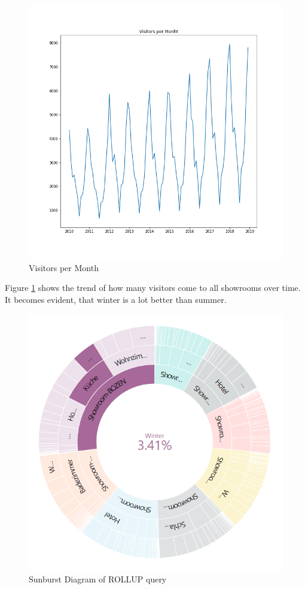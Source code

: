 \documentclass[letterpaper,12pt]{article}
\begin{document}
\begin{figure}[H] 
        \centering
        \includegraphics[width=\columnwidth]{../images/month.png}
        \caption{
                \label{fig:month}  
                Visitors per Month
        }
\end{figure}

Figure \ref{fig:month} shows the trend of how many visitors come to all showrooms over time. It becomes evident, that winter is a lot better than summer.

\begin{figure}[H] 
        \centering
        \includegraphics[width=\columnwidth]{../images/sunburst.PNG}
        \caption{
                \label{fig:sunburst}  
                Sunburst Diagram of ROLLUP query
        }
\end{figure}
\end{document}
